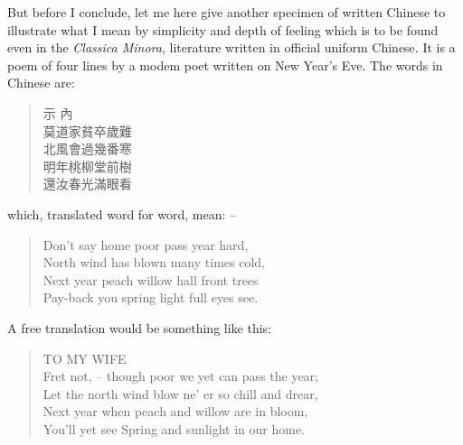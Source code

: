 But before I conclude, let me here give another specimen of written Chinese to illustrate 
what I mean by simplicity and depth of feeling which is to be found even in the \emph{Classica Minora},
literature written in official uniform Chinese.
It is a poem of four lines by a modem poet written on New Year's Eve.
The words in Chinese are:
\begin{quote}
示    內 \\
莫道家貧卒歲難 \\
北風會過幾番寒 \\
明年桃柳堂前樹 \\
還汝春光滿眼看
\end{quote}
which, translated word for word, mean:  --
\begin{quote}
Don't say home poor pass year hard, \\
North wind has blown many times cold, \\
Next year peach willow hall front trees \\
Pay-back you spring light full eyes see.
\end{quote}
A free translation would be something like this:
\begin{quote}
TO MY WIFE \\
Fret not,  -- though poor we yet can pass the year; \\
Let the north wind blow ne' er so chill and drear, \\
Next year when peach and willow are in bloom, \\
You'll yet see Spring and sunlight in our home.
\end{quote}

